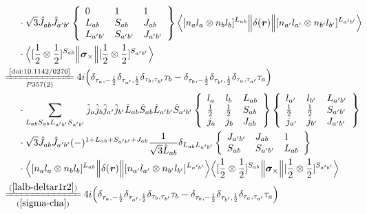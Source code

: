 \documentclass[master]{shnuthesis}
\newcommand{\bmr}{\textbf{\textit{r}}}
\newcommand{\ap}{a^\prime}
\newcommand{\bp}{b^\prime}
\newcommand{\il}{\!\!\!\!\!\!\!\!\!\!}
\newcommand{\zdydh}{\xlongequal}
\begin{document}
\begin{align}
    & \cdot \sqrt{3}\hat{J}_{ab}\hat{J}_{\ap\bp}  \left\{\begin{array}{lll} 0 & 1 & 1 \\ L_{ab} & S_{ab} & J_{ab} \\ L_{\ap\bp} & S_{\ap\bp} & J_{\ap\bp} \end{array}\right\}  \Big\langle [n_a l_a \otimes n_b l_b]^{L_{ab}} \Big\| \delta(\bmr) \Big\| [n_{\ap} l_{\ap} \otimes n_{\bp} l_{\bp}]^{L_{\ap\bp}} \Big\rangle  \notag\\
    & \cdot \Big\langle [\frac{1}{2}\otimes\frac{1}{2}]^{S_{ab}} \Big\| \bm{\sigma}_\times \Big\| [\frac{1}{2}\otimes\frac{1}{2}]^{S_{\ap\bp}} \Big\rangle \\
    &\il \zdydh[P357(2)]{\text{\cite{doi:10.1142/0270}}} 4i \Big( \delta_{\tau_a,-\frac{1}{2}}\delta_{\tau_{\ap},\frac{1}{2}}\delta_{\tau_b,\tau_{\bp}}\tau_b - \delta_{\tau_b,-\frac{1}{2}}\delta_{\tau_{\bp},\frac{1}{2}}\delta_{\tau_a,\tau_{\ap}}\tau_a \Big) \notag\\
    & \cdot \sum_{L_{ab}S_{ab}L_{\ap\bp}S_{\ap\bp}} \hat{j}_a\hat{j}_b\hat{j}_{\ap}\hat{j}_{\bp}\hat{L}_{ab}\hat{S}_{ab}\hat{L}_{\ap\bp}\hat{S}_{\ap\bp}  \left\{\begin{array}{lll}l_{a} & l_{b} & L_{ab} \\ \frac{1}{2} & \frac{1}{2} & S_{ab} \\j_{a} & j_{b} & J_{ab} \end{array}\right\}  \left\{\begin{array}{lll}l_{\ap} & l_{\bp} & L_{\ap\bp} \\ \frac{1}{2} & \frac{1}{2} & S_{\ap\bp} \\j_{\ap} & j_{\bp} & J_{\ap\bp} \end{array}\right\}  \notag \\
    & \cdot \sqrt{3}\hat{J}_{ab}\hat{J}_{\ap\bp}(-)^{1+L_{ab}+S_{\ap\bp}+J_{ab}}\frac{1}{\sqrt{3}\hat{L}_{ab}}\delta_{L_{ab}L_{\ap\bp}}  \left\{\begin{array}{lll} J_{\ap\bp} & J_{ab} & 1 \\ S_{ab} & S_{\ap\bp} & L_{ab} \end{array}\right\}  \notag\\
    & \cdot \Big\langle [n_a l_a \otimes n_b l_b]^{L_{ab}} \Big\| \delta(\bmr) \Big\| [n_{\ap} l_{\ap} \otimes n_{\bp} l_{\bp}]^{L_{\ap\bp}} \Big\rangle \Big\langle [\frac{1}{2}\otimes\frac{1}{2}]^{S_{ab}} \Big\| \bm{\sigma}_\times \Big\| [\frac{1}{2}\otimes\frac{1}{2}]^{S_{\ap\bp}} \Big\rangle \\
    &\il \zdydh[(\ref{sigma-cha})]{(\ref{lalb-deltar1r2})} 4i \Big( \delta_{\tau_a,-\frac{1}{2}}\delta_{\tau_{\ap},\frac{1}{2}}\delta_{\tau_b,\tau_{\bp}}\tau_b - \delta_{\tau_b,-\frac{1}{2}}\delta_{\tau_{\bp},\frac{1}{2}}\delta_{\tau_a,\tau_{\ap}}\tau_a \Big) \notag\\

\end{align}
\end{document}
